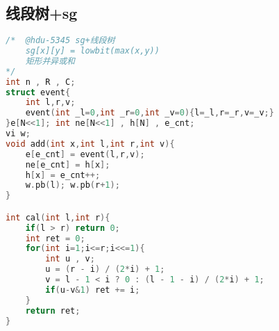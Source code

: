 \subsection{线段树+sg}
\begin{lstlisting}[language=C++]
/*	@hdu-5345 sg+线段树
	sg[x][y] = lowbit(max(x,y))
	矩形并异或和
*/
int n , R , C;
struct event{
	int l,r,v;
	event(int _l=0,int _r=0,int _v=0){l=_l,r=_r,v=_v;}
}e[N<<1]; int ne[N<<1] , h[N] , e_cnt;
vi w;
void add(int x,int l,int r,int v){
	e[e_cnt] = event(l,r,v);
	ne[e_cnt] = h[x];
	h[x] = e_cnt++;
	w.pb(l); w.pb(r+1);
}

int cal(int l,int r){
	if(l > r) return 0;
	int ret = 0;
	for(int i=1;i<=r;i<<=1){
		int u , v;
		u = (r - i) / (2*i) + 1;
		v = l - 1 < i ? 0 : (l - 1 - i) / (2*i) + 1;
		if(u-v&1) ret += i;
	}
	return ret;
}


\end{lstlisting}
